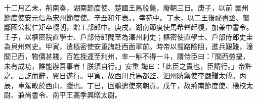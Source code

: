\begin{pinyinscope}
 十二月乙未，荊南奏，湖南節度使、楚國王馬殷薨，廢朝三日。庚子，以前
 襄州節度使安元信為宋州節度使。辛丑和年表。，幸苑中。丁未，以二王後祕書丞、襲酅國公楊仁矩卒輟朝，贈工部郎中。庚戌，湖南節度使馬希聲起復，加兼中書令。壬子，以樞密院直學士、戶部侍郎閻至為澤州刺史；樞密使直學士、戶部侍郎史圭為貝州刺史。甲寅，遣樞密使安重誨赴西面軍前。時帝以蜀路險阻，進兵艱難，潼關已西，物價甚賤，百姓挽運至利州，率一斛不得一斗，謂侍臣曰：「關西勞擾，未有成功，誰能辦吾事者！朕須自行。」安重
 誨曰：「此臣之責也，臣請行。」帝許之。言訖而辭，翼日遂行。甲寅，故西川兵馬都監、泗州防禦使李嚴贈太傅。丙辰，車駕畋於西山，臘也。丁巳，回鶻遣使來朝貢。戊午，故荊南節度使、檢校太尉、兼尚書令、南平王高季興贈太尉。



\end{pinyinscope}